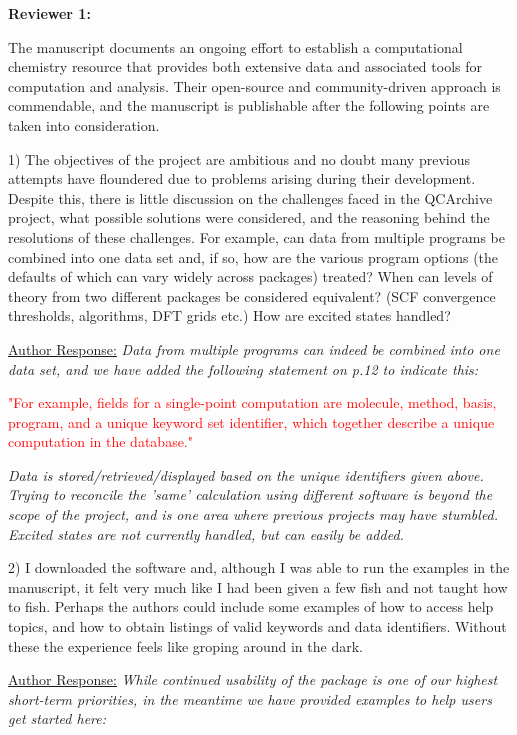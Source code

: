 \documentclass[12pt]{article}
\begin{document}
\noindent
\textbf{Reviewer 1:}

The manuscript documents an ongoing effort to establish a computational
chemistry resource that provides both extensive data and associated tools for 
computation and analysis.  Their open-source and community-driven approach is
commendable, and the manuscript is publishable after the following points are
taken into consideration.

1) The objectives of the project are ambitious and no doubt many previous
attempts have floundered due to problems arising during their development.
Despite this, there is little discussion on the challenges faced in the 
QCArchive project, what possible solutions were considered, and the reasoning
behind the resolutions of these challenges.  For example, can data from
multiple programs be combined into one data set and, if so, how are the various
program options (the defaults of which can vary widely across packages) treated?
When can levels of theory from two different packages be considered equivalent?
(SCF convergence thresholds, algorithms, DFT grids etc.)  How are excited
states handled?

\noindent \underline{Author Response:} \textit{Data from multiple programs can
indeed be combined into one data set, and we have added the following
statement on p.12 to indicate this:}

\noindent \textcolor{red}{"For example, fields for a single-point computation are molecule, method, basis, program, and a unique keyword set identifier, which together describe a unique computation in the database."}

\noindent
\textit{Data is stored/retrieved/displayed based
on the unique identifiers given above. Trying to reconcile the 'same'
calculation using different software is beyond the scope of the project, and
is one area where previous projects may have stumbled. Excited states are not
currently handled, but can easily be added.}

2) I downloaded the software and, although I was able to run the examples in the 
manuscript, it felt very much like I had been given a few fish and not taught
how to fish.  Perhaps the authors could include some examples of how to access
help topics, and how to obtain listings of valid keywords and data identifiers.
Without these the experience feels like groping around in the dark.

\noindent \underline{Author Response:} \textit{While continued usability of
the package is one of our highest short-term priorities, in the meantime we
have provided examples to help users get started here:}
\end{document}
